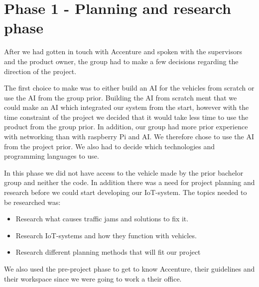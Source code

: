 \section{Phase 1 - Planning and research phase}

After we had gotten in touch with Accenture and spoken with the supervisors and the product owner, the group had to make a few decisions regarding the direction of the project.

The first choice to make was to either build an AI for the vehicles from scratch or use the AI from the group prior. Building the AI from scratch ment that we could make an AI which integrated our system from the start, however with the time constraint of the project we decided that it would take less time to use the product from the group prior. In addition, our group had more prior experience with networking than with raspberry Pi and AI. We therefore chose to use the AI from the project prior. We also had to decide which technologies and programming languages to use.

In this phase we did not have access to the vehicle made by the prior bachelor group and neither the code. In addition there was a need for project planning and research before we could start developing our IoT-system. The topics needed to be researched was:

\begin{itemize}
\item Research what causes traffic jams and solutions to fix it.
\item Research IoT-systems and how they function with vehicles.
\item Research different planning methods that will fit our project
\end{itemize}
We also used the pre-project phase to get to know Accenture, their guidelines and their workspace since we were going to work a their office. 








\clearpage
